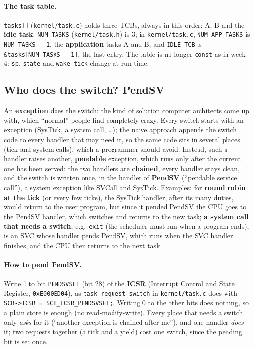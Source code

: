 \paragraph{The task table.} \texttt{tasks[]} (\texttt{kernel/task.c}) holds three TCBs, always in this order: A, B and the \textbf{idle task}. \texttt{NUM\_TASKS} (\texttt{kernel/task.h}) is 3; in \texttt{kernel/task.c}, \texttt{NUM\_APP\_TASKS} is \texttt{NUM\_TASKS - 1}, the \textbf{application} tasks A and B, and \texttt{IDLE\_TCB} is \texttt{\&tasks[NUM\_TASKS - 1]}, the last entry. The table is no longer \texttt{const} as in week 4: \texttt{sp}, \texttt{state} and \texttt{wake\_tick} change at run time.

\subsection{Who does the switch? PendSV}
An \textbf{exception} does the switch: the kind of solution computer architects come up with, which ``normal'' people find completely crazy. Every switch starts with an exception (SysTick, a system call, \dots); the naive approach appends the switch code to every handler that may need it, so the same code sits in several places (tick and system calls), which a programmer should avoid. Instead, such a handler raises another, \textbf{pendable} exception, which runs only after the current one has been served: the two handlers are \textbf{chained}, every handler stays clean, and the switch is written once, in the handler of \textbf{PendSV} (``pendable service call''), a system exception like SVCall and SysTick. Examples: for \textbf{round robin at the tick} (or every few ticks), the SysTick handler, after its many duties, would return to the user program, but since it pended PendSV the CPU goes to the PendSV handler, which switches and returns to the new task; \textbf{a system call that needs a switch}, e.g.\ \texttt{exit} (the scheduler must run when a program ends), is an SVC whose handler pends PendSV, which runs when the SVC handler finishes, and the CPU then returns to the next task.

\paragraph{How to pend PendSV.} Write 1 to bit \texttt{PENDSVSET} (bit 28) of the \textbf{ICSR} (Interrupt Control and State Register, \texttt{0xE000ED04}), as \texttt{task\_request\_switch} in \texttt{kernel/task.c} does with \texttt{SCB->ICSR = SCB\_ICSR\_PENDSVSET;}. Writing 0 to the other bits does nothing, so a plain store is enough (no read-modify-write). Every place that needs a switch only \emph{asks} for it (``another exception is chained after me''), and one handler \emph{does} it; two requests together (a tick and a yield) cost one switch, since the pending bit is set once.

